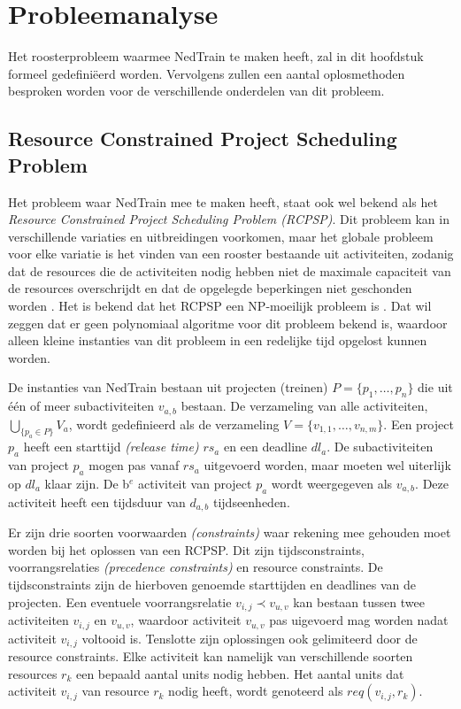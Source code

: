 \section{Probleemanalyse}
\label{sec:probleemanalyse}

Het roosterprobleem waarmee NedTrain te maken heeft, zal in dit hoofdstuk formeel gedefini\"eerd worden. Vervolgens zullen een aantal oplosmethoden besproken worden voor de verschillende onderdelen van dit probleem.

\subsection{Resource Constrained Project Scheduling Problem}
Het probleem waar NedTrain mee te maken heeft, staat ook wel bekend als het \emph{Resource Constrained Project Scheduling Problem (RCPSP)}. Dit probleem kan in verschillende variaties en uitbreidingen voorkomen, maar het globale probleem voor elke variatie is het vinden van een rooster bestaande uit activiteiten, zodanig dat de resources die de activiteiten nodig hebben niet de maximale capaciteit van de resources overschrijdt en dat de opgelegde beperkingen niet geschonden worden \cite{lombardi2010constraint}. Het is bekend dat het RCPSP een NP-moeilijk probleem is \cite{blazewicz1983scheduling}. Dat wil zeggen dat er geen polynomiaal algoritme voor dit probleem bekend is, waardoor alleen kleine instanties van dit probleem in een redelijke tijd opgelost kunnen worden.

De instanties van NedTrain bestaan uit projecten (treinen) $P = \{p_1, \dots , p_n\}$ die uit \'e\'en of meer subactiviteiten $v_{a,b}$ bestaan. De verzameling van alle activiteiten, $\bigcup_{\{p_a \in P\}} V_a$, wordt gedefinieerd als de verzameling $V = \{v_{1,1}, \dots , v_{n,m}\}$. Een project $p_a$ heeft een starttijd \emph{(release time)} $rs_a$ en een deadline $dl_a$. De subactiviteiten van project $p_a$ mogen pas vanaf $rs_a$ uitgevoerd worden, maar moeten wel uiterlijk op $dl_a$ klaar zijn. De b$^e$ activiteit van project $p_a$ wordt weergegeven als $v_{a,b}$. Deze activiteit heeft een tijdsduur van $d_{a,b}$ tijdseenheden.

Er zijn drie soorten voorwaarden \emph{(constraints)} waar rekening mee gehouden moet worden bij het oplossen van een RCPSP. Dit zijn tijdsconstraints, voorrangsrelaties \emph{(precedence constraints)} en resource constraints. De tijdsconstraints zijn de hierboven genoemde starttijden en deadlines van de projecten. Een eventuele voorrangsrelatie $v_{i,j} \prec v_{u,v}$ kan bestaan tussen twee activiteiten $v_{i,j}$ en $v_{u,v}$, waardoor activiteit $v_{u,v}$ pas uigevoerd mag worden nadat activiteit $v_{i,j}$ voltooid is. Tenslotte zijn oplossingen ook gelimiteerd door de resource constraints. Elke activiteit kan namelijk van verschillende soorten resources $r_k$ een bepaald aantal units nodig hebben. Het aantal units dat activiteit $v_{i,j}$ van resource $r_k$ nodig heeft, wordt genoteerd als $req(v_{i,j},r_k)$.

